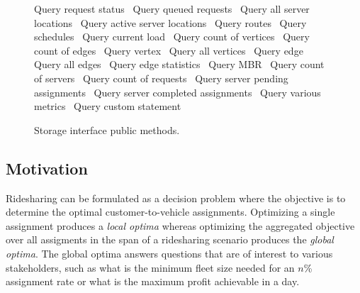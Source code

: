 \documentclass{article}
\def\nwendcode{\endtrivlist \endgroup}      %
\let\nwdocspar=\par
\theoremstyle{definition}                   %
\begin{document}
\begin{figure}
{\begin{minipage}[t]{0.4\textwidth}
\LA{}Query request status~{\nwtagstyle{}}\RA{}
\LA{}Query queued requests~{\nwtagstyle{}}\RA{}
\LA{}Query all server locations~{\nwtagstyle{}}\RA{}
\LA{}Query active server locations~{\nwtagstyle{}}\RA{}
\LA{}Query routes~{\nwtagstyle{}}\RA{}
\LA{}Query schedules~{\nwtagstyle{}}\RA{}
\LA{}Query current load~{\nwtagstyle{}}\RA{}
\LA{}Query count of vertices~{\nwtagstyle{}}\RA{}
\LA{}Query count of edges~{\nwtagstyle{}}\RA{}
\LA{}Query vertex~{\nwtagstyle{}}\RA{}
\LA{}Query all vertices~{\nwtagstyle{}}\RA{}
\LA{}Query edge~{\nwtagstyle{}}\RA{}
\LA{}Query all edges~{\nwtagstyle{}}\RA{}
\LA{}Query edge statistics~{\nwtagstyle{}}\RA{}
\LA{}Query MBR~{\nwtagstyle{}}\RA{}
\LA{}Query count of servers~{\nwtagstyle{}}\RA{}
\LA{}Query count of requests~{\nwtagstyle{}}\RA{}
\LA{}Query server pending assignments~{\nwtagstyle{}}\RA{}
\LA{}Query server completed assignments~{\nwtagstyle{}}\RA{}
\LA{}Query various metrics~{\nwtagstyle{}}\RA{}
\LA{}Query custom statement~{\nwtagstyle{}}\RA{}
\nwendcode{}\nwdocspar
\end{minipage}
}
\caption{Storage interface public methods.}
\label{fig:methods}
\end{figure}

\subsection{Motivation}
\label{sec:motivation}
Ridesharing can be formulated as a decision problem where the objective is to
determine the optimal customer-to-vehicle assignments. Optimizing a single
assignment produces a \emph{local optima} whereas optimizing the aggregated
objective over all assigments in the span of a ridesharing scenario produces
the \emph{global optima}. The global optima answers questions that are of
interest to various stakeholders, such as what is the minimum fleet size needed
for an $n$\% assignment rate or what is the maximum profit achievable in a day.
\end{document}
